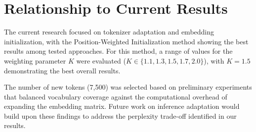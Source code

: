 \section{Relationship to Current Results}
The current research focused on tokenizer adaptation and embedding initialization, with the Position-Weighted Initialization method showing the best results among tested approaches. For this method, a range of values for the weighting parameter $K$ were evaluated ($K \in \{1.1, 1.3, 1.5, 1.7, 2.0\}$), with $K = 1.5$ demonstrating the best overall results.

The number of new tokens (7,500) was selected based on preliminary experiments that balanced vocabulary coverage against the computational overhead of expanding the embedding matrix. Future work on inference adaptation would build upon these findings to address the perplexity trade-off identified in our results.
